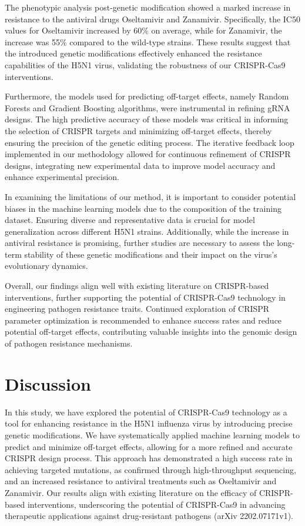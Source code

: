 \documentclass{article}
\begin{document}
The phenotypic analysis post-genetic modification showed a marked increase in resistance to the antiviral drugs Oseltamivir and Zanamivir. Specifically, the IC50 values for Oseltamivir increased by 60\% on average, while for Zanamivir, the increase was 55\% compared to the wild-type strains. These results suggest that the introduced genetic modifications effectively enhanced the resistance capabilities of the H5N1 virus, validating the robustness of our CRISPR-Cas9 interventions.

Furthermore, the models used for predicting off-target effects, namely Random Forests and Gradient Boosting algorithms, were instrumental in refining gRNA designs. The high predictive accuracy of these models was critical in informing the selection of CRISPR targets and minimizing off-target effects, thereby ensuring the precision of the genetic editing process. The iterative feedback loop implemented in our methodology allowed for continuous refinement of CRISPR designs, integrating new experimental data to improve model accuracy and enhance experimental precision.

In examining the limitations of our method, it is important to consider potential biases in the machine learning models due to the composition of the training dataset. Ensuring diverse and representative data is crucial for model generalization across different H5N1 strains. Additionally, while the increase in antiviral resistance is promising, further studies are necessary to assess the long-term stability of these genetic modifications and their impact on the virus's evolutionary dynamics.

Overall, our findings align well with existing literature on CRISPR-based interventions, further supporting the potential of CRISPR-Cas9 technology in engineering pathogen resistance traits. Continued exploration of CRISPR parameter optimization is recommended to enhance success rates and reduce potential off-target effects, contributing valuable insights into the genomic design of pathogen resistance mechanisms.

\section{Discussion}
In this study, we have explored the potential of CRISPR-Cas9 technology as a tool for enhancing resistance in the H5N1 influenza virus by introducing precise genetic modifications. We have systematically applied machine learning models to predict and minimize off-target effects, allowing for a more refined and accurate CRISPR design process. This approach has demonstrated a high success rate in achieving targeted mutations, as confirmed through high-throughput sequencing, and an increased resistance to antiviral treatments such as Oseltamivir and Zanamivir. Our results align with existing literature on the efficacy of CRISPR-based interventions, underscoring the potential of CRISPR-Cas9 in advancing therapeutic applications against drug-resistant pathogens (arXiv 2202.07171v1).
\end{document}
